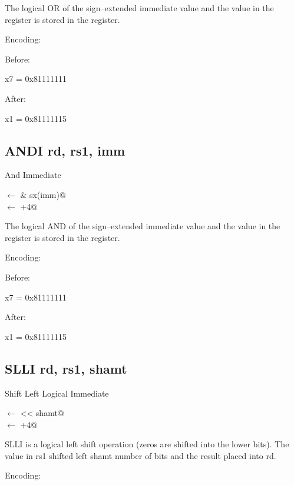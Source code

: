 The logical OR of the sign--extended immediate value and the value 
in the  register is stored in the  register.

Encoding:


Before:

x7 = 0x81111111

After:

x1 = 0x81111115

\subsection{ANDI rd, rs1, imm}

And Immediate

\verb@rd@ $\leftarrow$  & sx(imm)@\\
\verb@pc@ $\leftarrow$ \verb@pc+4@

The logical AND of the sign--extended immediate value and the value 
in the  register is stored in the  register.


Encoding:


Before:

x7 = 0x81111111

After:

x1 = 0x81111115

\subsection{SLLI rd, rs1, shamt}

Shift Left Logical Immediate

\verb@rd@ $\leftarrow$  << shamt@\\
\verb@pc@ $\leftarrow$ \verb@pc+4@


SLLI is a logical left shift operation (zeros are shifted
into the lower bits).  The value in rs1 shifted left shamt
number of bits and the result placed into rd.~\cite[p.~14]{rvismv1v22:2017}

Encoding:


